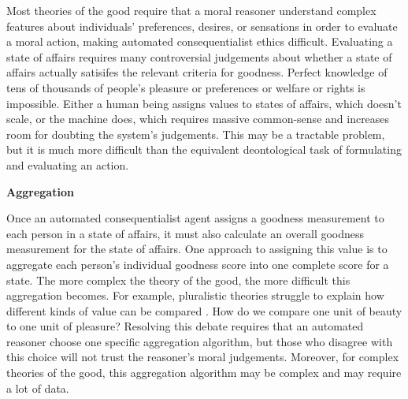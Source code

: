\begin{isabellebody}
\begin{isamarkuptext}
Most theories of the good require that a moral reasoner understand complex features about
individuals' preferences, desires, or sensations in order to evaluate a moral action, making automated
consequentialist ethics difficult. Evaluating a state of affairs requires many controversial
judgements about whether a state of affairs actually satisifes the relevant criteria for goodness. 
Perfect knowledge of tens of thousands of 
people's pleasure or preferences or welfare or rights is impossible. Either a human being 
assigns values to states of affairs, which doesn't scale, or the machine does, 
which requires massive common-sense and increases room for doubting the system's judgements. This may be 
a tractable problem, but it is much more difficult than the equivalent deontological task of formulating
and evaluating an action.%
\end{isamarkuptext}\isamarkuptrue%
%
\begin{isamarkuptext}%
\noindent \textbf{Aggregation}%
\end{isamarkuptext}\isamarkuptrue%
%
\begin{isamarkuptext}%
Once an automated consequentialist agent assigns a goodness measurement to each person in a state of affairs, it 
must also calculate an overall goodness measurement for the state of affairs. One approach to assigning
this value is to aggregate each person's individual goodness score into one complete score for a state. 
The more complex the theory of the good, the more difficult this aggregation becomes. For example, 
pluralistic theories struggle to explain how different kinds of value can be compared \citep{consequentialismsep}. 
How do we compare one unit of beauty to one unit of pleasure? Resolving this debate requires that an automated reasoner 
choose one specific aggregation algorithm, but those who disagree with this choice will not trust 
the reasoner's moral judgements. Moreover, for complex theories of the good, this aggregation algorithm
may be complex and may require a lot of data. 


\end{isamarkuptext}
\end{isabellebody}
